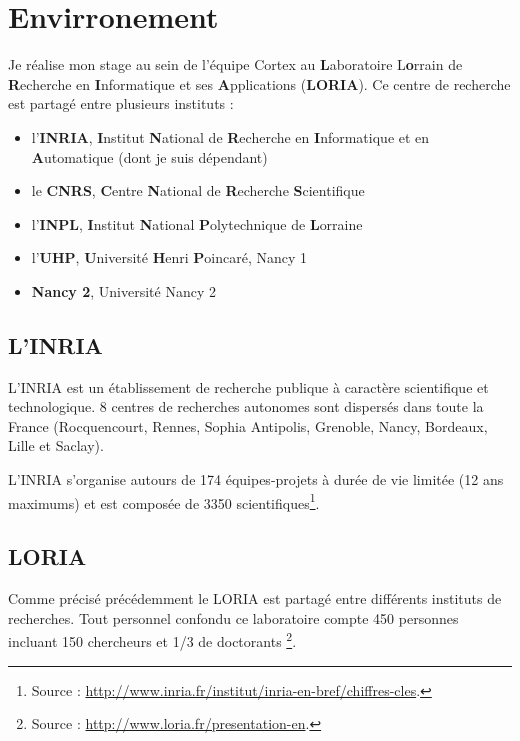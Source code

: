 \chapter{Envirronement} %
\label{cha:Envirronement}

Je réalise mon stage au sein de l'équipe Cortex au \textbf{L}aboratoire L\textbf{o}rrain de
\textbf{R}echerche en \textbf{I}nformatique et ses \textbf{A}pplications (\textbf{LORIA}).
Ce centre de recherche est partagé entre plusieurs instituts :
\begin{itemize}
   \item l'\textbf{INRIA}, \textbf{I}nstitut \textbf{N}ational de \textbf{R}echerche en \textbf{I}nformatique
      et en \textbf{A}utomatique (dont je suis dépendant)
   \item le \textbf{CNRS}, \textbf{C}entre \textbf{N}ational de \textbf{R}echerche \textbf{S}cientifique
   \item l'\textbf{INPL}, \textbf{I}nstitut \textbf{N}ational \textbf{P}olytechnique de \textbf{L}orraine
   \item l'\textbf{UHP}, \textbf{U}niversité \textbf{H}enri \textbf{P}oincaré, Nancy 1
   \item \textbf{Nancy 2}, Université Nancy 2
\end{itemize}

\section{L'INRIA} %
\label{sec:L'INRIA}

L'INRIA est un établissement de recherche publique à caractère scientifique et technologique. 8 centres de
recherches autonomes sont dispersés dans toute la France (Rocquencourt, Rennes, Sophia Antipolis, Grenoble,
Nancy, Bordeaux, Lille et Saclay).

L'INRIA s'organise autours de 174 équipes-projets à durée de vie limitée (12 ans maximums) et est composée
de 3350 scientifiques\footnote{Source : \url{http://www.inria.fr/institut/inria-en-bref/chiffres-cles}.}.


\section{LORIA} %
\label{sec:LORIA}

Comme précisé précédemment le LORIA est partagé entre différents instituts de recherches. Tout personnel confondu
ce laboratoire compte 450 personnes incluant 150 chercheurs et 1/3 de doctorants
\footnote{Source : \url{http://www.loria.fr/presentation-en}.}.

